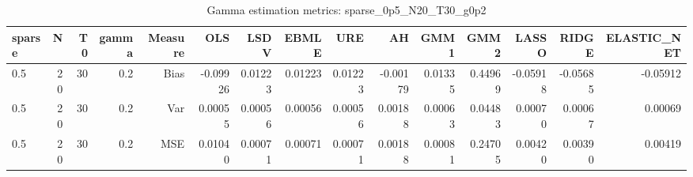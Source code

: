 \begin{table}[!htbp]\centering
\caption{Gamma estimation metrics: sparse_0p5_N20_T30_g0p2}
\label{tab:table1_sparse_0p5_N20_T30_g0p2}
\begin{tabular}{lrrrrrrrrrrrrrr}
\hline
sparse & N & T0 & gamma & Measure & OLS & LSDV & EBMLE & URE & AH & GMM1 & GMM2 & LASSO & RIDGE & ELASTIC_NET \\
\hline
0.5 & 20 & 30 & 0.2 & Bias & -0.09926 & 0.01223 & 0.01223 & 0.01223 & -0.00179 & 0.01335 & 0.44969 & -0.05918 & -0.05685 & -0.05912 \\
0.5 & 20 & 30 & 0.2 & Var & 0.00055 & 0.00056 & 0.00056 & 0.00056 & 0.00188 & 0.00063 & 0.04483 & 0.00070 & 0.00067 & 0.00069 \\
0.5 & 20 & 30 & 0.2 & MSE & 0.01040 & 0.00071 & 0.00071 & 0.00071 & 0.00188 & 0.00081 & 0.24705 & 0.00420 & 0.00390 & 0.00419 \\
\hline
\end{tabular}
\end{table}

